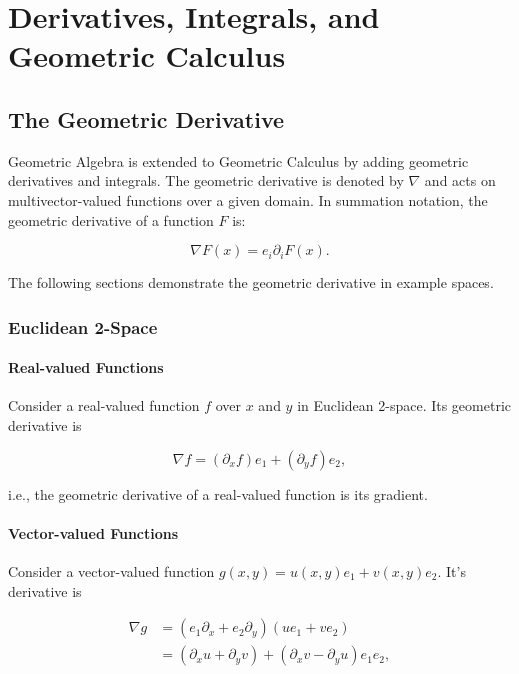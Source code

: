 \chapter{Derivatives, Integrals, and Geometric Calculus}

	\section{The Geometric Derivative}
	
	Geometric Algebra is extended to Geometric Calculus by adding geometric derivatives and integrals. The geometric derivative is denoted by $\nabla$ and acts on multivector-valued functions over a given domain. In summation notation, the geometric derivative of a function $F$ is:
	
	\[
	\nabla F\left( x\right)  = e_i\partial_i F \left( x\right).
	\]
	
	The following sections demonstrate the geometric derivative in example spaces.
	
	\subsection{Euclidean 2-Space}
	
	\subsubsection{Real-valued Functions}
	
	Consider a real-valued function $f$ over $x$ and $y$ in Euclidean 2-space. Its geometric derivative is
	
	\[
	\nabla f = \left( \partial_x f\right) e_1  + \left( \partial_y f\right) e_2,
	\]
	
	i.e., the geometric derivative of a real-valued function is its gradient.
	
	\subsubsection{Vector-valued Functions}
	
	Consider a vector-valued function $g\left( x, y\right) = u \left( x, y\right)e_1 + v\left( x, y\right)e_2.$ It's derivative is
	
	\begin{align*}
	\nabla g & = \left(e_1\partial_x + e_2\partial_y \right) \left(ue_1 + ve_2 \right) \\
	 & = \left( \partial_x u + \partial_y v\right) + \left( \partial_x v - \partial_y u\right)e_1e_2,  
	\end{align*}
	
